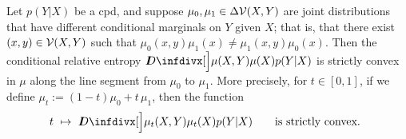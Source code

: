 \begin{lemma}
    Let $p(Y|X)$ be a cpd,
    and suppose $\mu_0, \mu_1 \in \Delta \mathcal V(X,Y)$ are joint distributions that have different conditional marginals on $Y$ given $X$; that is, that
    there exist $(x,y) \in \mathcal V(X,Y)$ such that
    $
        \mu_0(x,y) \mu_1(x)  \ne \mu_1(x,y) \mu_0(x).
    $
    Then the conditional relative entropy 
    $
        \kldiv[\Big]{ \mu(X,Y) }{ \mu(X) p(Y|X) }
    $
    is strictly convex in $\mu$ along the line segment from $\mu_0$ to $\mu_1$. 
    More precisely, for $t \in [0,1]$, if we define
    $\mu_t := (1-t) \mu_0 + t\, \mu_1$, then 
    the function
    \[
    t ~\mapsto~ \kldiv[\Big]{ \mu_t(X,Y) }
        {\mu_t(X) p(Y|X)}
        \qquad\text{is strictly convex. }
    \]
\end{lemma}
